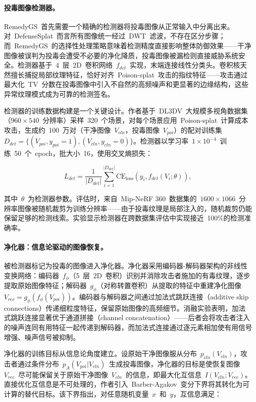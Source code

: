 \paragraph{投毒图像检测器。}
RemedyGS~首先需要一个精确的检测器将投毒图像从正常输入中分离出来。对~DefenseSplat~而言所有图像统一经过~DWT~滤波，不存在区分步骤；而~RemedyGS~的选择性处理策略意味着检测精度直接影响整体防御效果——干净图像被误判为投毒会遭受不必要的净化降质，投毒图像被漏检则直接威胁系统安全。检测器基于~4~层~2D~卷积网络~$f_{det}$~实现，末端连接线性分类头。卷积核天然擅长捕捉局部纹理特征，恰好对齐~Poison-splat~攻击的指纹特征——攻击通过最大化~TV~分数在投毒图像中引入不自然的高频噪声和更显著的边缘结构，这些异常纹理模式成为可靠的检测签名。

检测器的训练数据构建是一个关键设计。作者基于~DL3DV~大规模多视角数据集（$960 \times 540$~分辨率）采样~320~个场景，对每个场景应用~Poison-splat~计算成本攻击，生成约~100~万对（干净图像~$V_{cln}$，投毒图像~$V_{poi}$）的配对训练集~$D_{det} = \{(V_{poi}, y_{poi}=1), (V_{cln}, y_{cln}=0)\}$。检测器以学习率~$1 \times 10^{-4}$~训练~50~个~epoch，批大小~16，使用交叉熵损失：

\begin{equation}
L_{det} = \frac{1}{|D_{det}|} \sum_{i=1}^{|D_{det}|} \mathrm{CE}_{\mathrm{loss}}(y_i, f_{det}(V_i; \theta)),
\end{equation}

其中~$\theta$~为检测器参数。评估时，来自~Mip-NeRF 360~数据集的~$1600 \times 1066$~分辨率图像被随机裁剪为训练分辨率——由于投毒纹理是局部注入的，随机裁剪仍能保留足够的检测线索。实验显示检测器在跨数据集评估中实现接近~100\%的检测准确率。

\paragraph{净化器：信息论驱动的图像恢复。}
被检测器标记为投毒的图像进入净化器。净化器采用编码器-解码器架构的非线性变换网络：编码器~$f_\phi$（5~层~2D~卷积）识别并消除攻击者施加的有毒纹理，逐步提取原始图像特征；解码器~$g_\phi$（对称转置卷积）从提取的特征中重建净化图像~$V_{rec} = g_\phi(f_\phi(V_{poi}))$。编码器与解码器之间通过加法式跳跃连接（additive skip connections）传递细粒度特征，保留原始图像的高频细节。消融实验表明，加法式跳跃连接显著优于通道拼接（channel concatenation）——后者会将攻击者注入的噪声连同有用特征一起传递到解码器，而加法式连接通过逐元素相加使有用信号增强、噪声信号被抑制。

净化器的训练目标从信息论角度建立。设原始干净图像服从分布~$p_{cln}(V_{cln})$，攻击者通过条件分布~$p_A(V_{poi}|V_{cln})$~生成投毒图像，净化器的目标是使恢复图像~$V_{rec}$~尽可能保留关于原始干净图像~$V_{cln}$~的信息，即最大化互信息~$I(V_{cln}; V_{rec})$。直接优化互信息是不可处理的，作者引入~Barber-Agakov~变分下界将其转化为可计算的替代目标。该下界指出，对任意随机变量~$x$~和~$y$，互信息满足：

